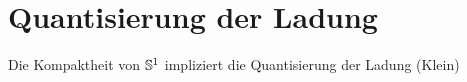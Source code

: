 \section{Quantisierung der Ladung}
Die Kompaktheit von $\mathbb{S}^1$ impliziert die Quantisierung der Ladung (Klein)
